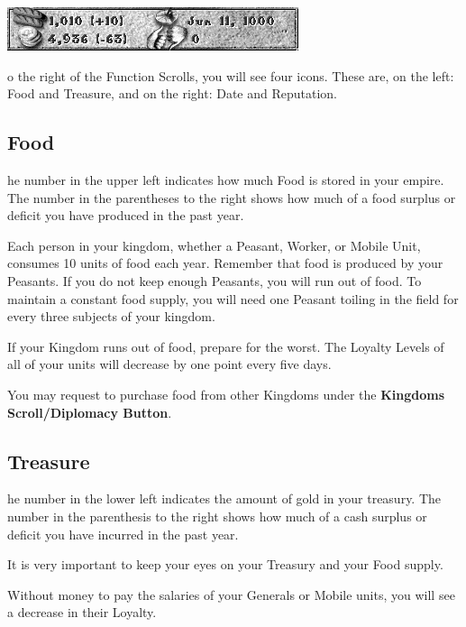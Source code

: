 \begin{center}
    \includegraphics[width=0.6\linewidth]{Ifoodgoldetc} %
\end{center}

o the right of the Function Scrolls, you will see four icons. These are, on the left: Food and Treasure, and on the right: Date and Reputation.

\subsection{\textsf{Food}}


he number in the upper left indicates how much Food is stored in your empire. The number in the parentheses to the right shows how much of a food surplus or deficit you have produced in the past year.

Each person in your kingdom, whether a Peasant, Worker, or Mobile Unit, consumes 10 units of food each year. Remember that food is produced by your Peasants. If you do not keep enough Peasants, you will run out of food. To maintain a constant food supply, you will need one Peasant toiling in the field for every three subjects of your kingdom.

If your Kingdom runs out of food, prepare for the worst. The Loyalty Levels of all of your units will decrease by one point every five days.

You may request to purchase food from other Kingdoms under the \textbf{Kingdoms Scroll/Diplomacy Button}.

\subsection{\textsf{Treasure}}


he number in the lower left indicates the amount of gold in your treasury. The number in the parenthesis to the right shows how much of a cash surplus or deficit you have incurred in the past year.

It is very important to keep your eyes on your Treasury and your Food supply.

Without money to pay the salaries of your Generals or Mobile units, you will see a decrease in their Loyalty.

